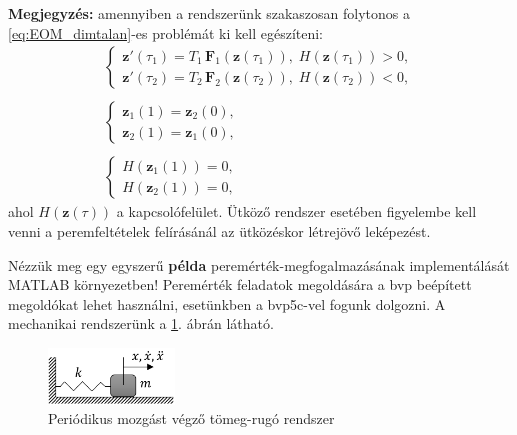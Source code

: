 \textbf{Megjegyzés:} amennyiben a rendszerünk szakaszosan folytonos a \eqref{eq:EOM_dimtalan}-es problémát ki kell egészíteni:
\begin{equation}
\begin{matrix}
\begin{cases}
\mathbf{z}'(\tau_1) = T_1\,\mathbf{F}_1(\mathbf{z}(\tau_1)), \; H(\mathbf{z}(\tau_1)) > 0,\\
\mathbf{z}'(\tau_2) = T_2\,\mathbf{F}_2(\mathbf{z}(\tau_2)), \; H(\mathbf{z}(\tau_2)) < 0,
\end{cases} \\\\
\begin{cases}
\mathbf{z}_1(1) = \mathbf{z}_2(0), \\
\mathbf{z}_2(1) = \mathbf{z}_1(0),
\end{cases} \\\\
\begin{cases}
H(\mathbf{z}_1(1)) = 0, \\
H(\mathbf{z}_2(1)) = 0,
\end{cases}
\end{matrix}
\end{equation}
ahol $H(\mathbf{z}(\tau))$  a kapcsolófelület.
Ütköző rendszer esetében figyelembe kell venni a peremfeltételek felírásánál az ütközéskor létrejövő leképezést.

Nézzük meg egy egyszerű \textbf{példa} peremérték-megfogalmazásának implementálását MATLAB környezetben!
Peremérték feladatok megoldására a bvp beépített megoldókat lehet használni, esetünkben a bvp5c-vel fogunk dolgozni.
A mechanikai rendszerünk a \ref{fig:bvp_tomeg_rugo}. ábrán látható.

\begin{figure}[ht]
	\centering
	\includegraphics[width=0.3\textwidth]{graphics/tomeg_rugo_modell}
	\caption{Periódikus mozgást végző tömeg-rugó rendszer}\label{fig:bvp_tomeg_rugo}
\end{figure}

